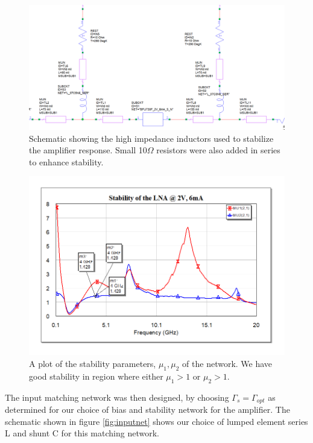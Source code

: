 \documentclass[twocolumn, aps, apl]{revtex4-1}
\begin{document}
    \begin{figure}[!htbp]
        \centering
        \includegraphics[scale=0.35]{LNA_net.png}
        \caption{Schematic showing the high impedance inductors used to stabilize the amplifier response. Small 10$\Omega$ resistors were also added in series to enhance stability.}
        \label{fig:LNAnet}
    \end{figure}

    \begin{figure}[!htbp]
    \centering
    \includegraphics[scale=0.3]{stability.png}
    \caption{A plot of the stability parameters, $\mu_1, \mu_2$ of the network. We have good stability in region where either $\mu_1 > 1$ or $\mu_2 > 1$. }
    \label{fig:stability}
    \end{figure}

The input matching network was then designed, by choosing $\Gamma_s = \Gamma_{opt}$ as determined for our choice of bias and stability network for the amplifier. The schematic shown in figure \ref{fig:inputnet} shows our choice of lumped element series L and shunt C for this matching network.
\end{document}
